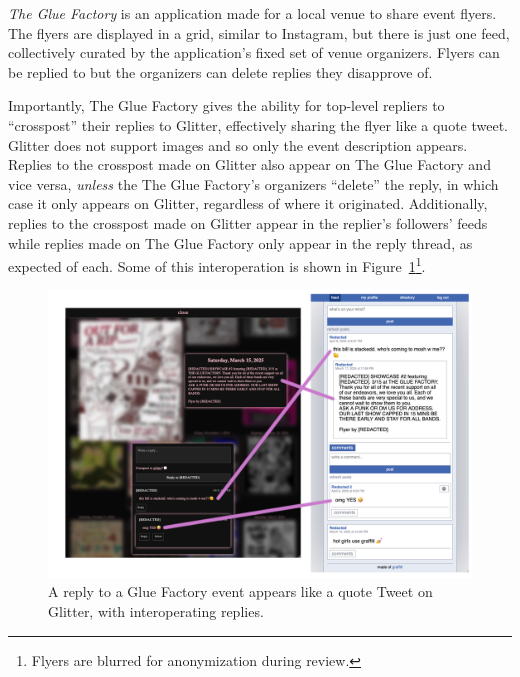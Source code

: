 \emph{The Glue Factory} is an application made for a local
venue to share event flyers.
The flyers are displayed in a grid, similar to Instagram,
but there is just one feed, collectively curated by
the application's fixed set of venue organizers.
Flyers can be replied to but the organizers can delete replies they disapprove of.

Importantly, The Glue Factory gives the ability for
top-level repliers to ``crosspost'' their replies
to Glitter, effectively sharing the flyer like a quote tweet.
Glitter does not support images and so only the
event description appears.
Replies to the crosspost made on Glitter also appear on The Glue Factory
and vice versa, \emph{unless} the The Glue Factory's organizers ``delete'' the reply,
in which case it only appears on Glitter, regardless of where it originated.
Additionally, replies to the crosspost made on Glitter appear in the replier's followers' feeds while replies made on The Glue Factory only appear in the reply thread, as expected of each.
Some of this interoperation is shown in Figure~\ref{case-studies:fig:gloof-and-glitter}\footnote{
Flyers are blurred for anonymization during review.
}.

\begin{figure}[h]
    \centering
    \includegraphics[width=\textwidth]{paper/figures/gloof-and-glitter.png}
    \caption{A reply to a Glue Factory event appears like a quote Tweet on Glitter, with
    interoperating replies.}
    
    \label{case-studies:fig:gloof-and-glitter}
\end{figure}

